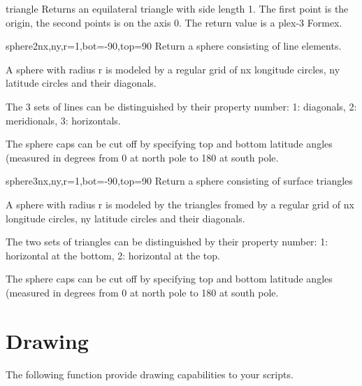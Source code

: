 \begin{funcdesc}{triangle}{}
Returns an equilateral triangle with side length 1. The first point is the origin, the second points is on the axis 0. The return value is a plex-3 Formex.
\end{funcdesc}


\begin{funcdesc}{sphere2}{nx,ny,r=1,bot=-90,top=90}
Return a sphere consisting of line elements.

A sphere with radius r is modeled by a regular grid of nx
longitude circles, ny latitude circles and their diagonals.
    
The 3 sets of lines can be distinguished by their property number:
1: diagonals, 2: meridionals, 3: horizontals.

The sphere caps can be cut off by specifying top and bottom latitude
angles (measured in degrees from 0 at north pole to 180 at south pole.
\end{funcdesc}

        
\begin{funcdesc}{sphere3}{nx,ny,r=1,bot=-90,top=90}
Return a sphere consisting of surface triangles

A sphere with radius r is modeled by the triangles fromed by a regular
grid of nx longitude circles, ny latitude circles and their diagonals.

The two sets of triangles can be distinguished by their property number:
1: horizontal at the bottom, 2: horizontal at the top.

The sphere caps can be cut off by specifying top and bottom latitude
angles (measured in degrees from 0 at north pole to 180 at south pole.
\end{funcdesc}



\section{Drawing}
\label{sec:drawing}

The following function provide drawing capabilities to your scripts.

